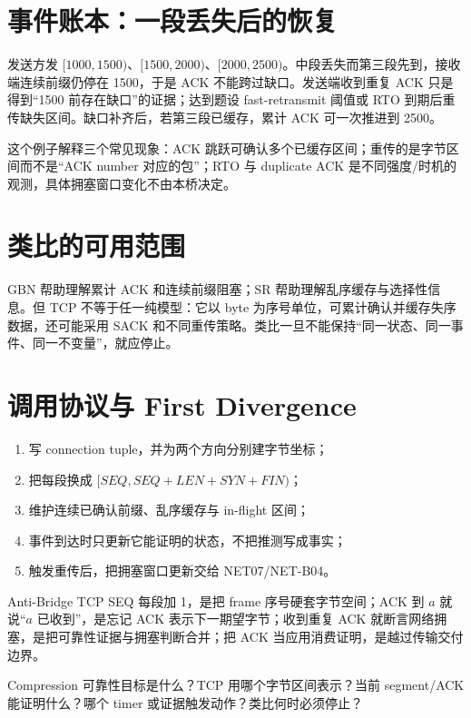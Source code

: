 \documentclass[UTF8,fontset=none,11pt,a4paper]{ctexart}
\begin{document}
\section{事件账本：一段丢失后的恢复}

发送方发 $[1000,1500)$、$[1500,2000)$、$[2000,2500)$。中段丢失而第三段先到，接收端连续前缀仍停在 1500，于是 ACK 不能跨过缺口。发送端收到重复 ACK 只是得到“1500 前存在缺口”的证据；达到题设 fast-retransmit 阈值或 RTO 到期后重传缺失区间。缺口补齐后，若第三段已缓存，累计 ACK 可一次推进到 2500。

这个例子解释三个常见现象：ACK 跳跃可确认多个已缓存区间；重传的是字节区间而不是“ACK number 对应的包”；RTO 与 duplicate ACK 是不同强度/时机的观测，具体拥塞窗口变化不由本桥决定。

\section{类比的可用范围}

GBN 帮助理解累计 ACK 和连续前缀阻塞；SR 帮助理解乱序缓存与选择性信息。但 TCP 不等于任一纯模型：它以 byte 为序号单位，可累计确认并缓存失序数据，还可能采用 SACK 和不同重传策略。类比一旦不能保持“同一状态、同一事件、同一不变量”，就应停止。

\section{调用协议与 First Divergence}

\begin{enumerate}
\item 写 connection tuple，并为两个方向分别建字节坐标；
\item 把每段换成 $[SEQ,SEQ+LEN+SYN+FIN)$；
\item 维护连续已确认前缀、乱序缓存与 in-flight 区间；
\item 事件到达时只更新它能证明的状态，不把推测写成事实；
\item 触发重传后，把拥塞窗口更新交给 NET07/NET-B04。
\end{enumerate}

\begin{warnbox}{Anti-Bridge}
TCP SEQ 每段加 1，是把 frame 序号硬套字节空间；ACK 到 $a$ 就说“$a$ 已收到”，是忘记 ACK 表示下一期望字节；收到重复 ACK 就断言网络拥塞，是把可靠性证据与拥塞判断合并；把 ACK 当应用消费证明，是越过传输交付边界。
\end{warnbox}

\begin{corebox}{Compression}
可靠性目标是什么？TCP 用哪个字节区间表示？当前 segment/ACK 能证明什么？哪个 timer 或证据触发动作？类比何时必须停止？
\end{corebox}
\end{document}
